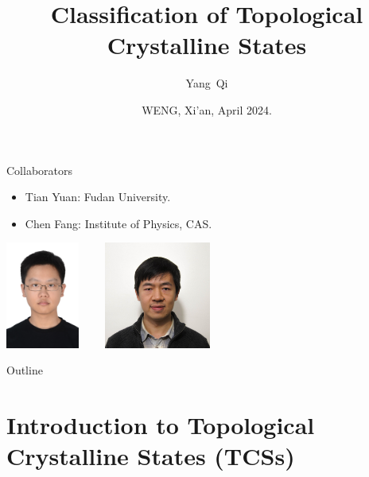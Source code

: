 \documentclass[xcolor=table, 11pt, aspectratio=169]{beamer}
\title[Space-group SPTs] %
{Classification of Topological Crystalline States}
\author[Y Qi] %
{Yang~Qi}
\institute[Fudan] %
{Department of Physics, Fudan University}
\date{WENG, Xi'an, April 2024.}
\begin{document}
\begin{frame}
  \titlepage
\end{frame}

\begin{frame}{Collaborators}
  \begin{itemize}
  \item Tian Yuan: Fudan University.
  \item Chen Fang: Institute of Physics, CAS.
\end{itemize}
\vspace{4em}
\begin{center}
        \includegraphics[height=3.5cm]{../people/tianyuan}~~~~
      \includegraphics[height=3.5cm]{../people/chenfang}
    \end{center}
\end{frame}

\begin{frame}{Outline}
      \tableofcontents
\end{frame}


\section{Introduction to Topological Crystalline States (TCSs)}
\end{document}
